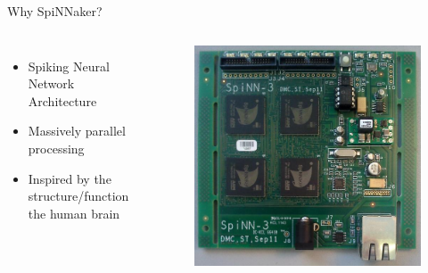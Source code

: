 \documentclass[17pt,mathserif]{beamer}
\begin{document}
    \begin{frame}{Why SpiNNaker?} %
        \vspace*{-3em}        
        \begin{columns}[c] %
            \begin{itemize}
                \item Spiking Neural Network Architecture 
                \item Massively parallel processing
                \item Inspired by the structure/function the human brain
            \end{itemize}
            \begin{figure}
                \includegraphics[width=\textwidth]{spin3}
            \end{figure}
        \end{columns}
    \end{frame}
    
\end{document}
